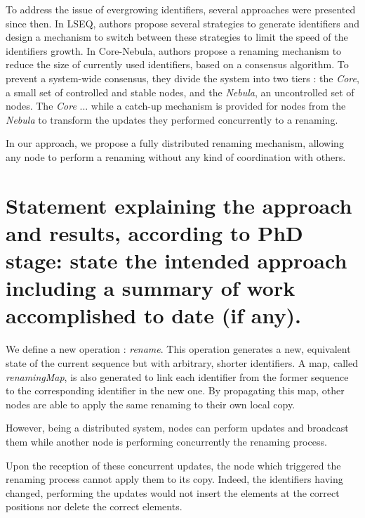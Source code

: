 \documentclass{article}
\begin{document}
To address the issue of evergrowing identifiers, several approaches were presented since then.
In LSEQ, authors propose several strategies to generate identifiers and design a mechanism to switch between these strategies to limit the speed of the identifiers growth.
In Core-Nebula, authors propose a renaming mechanism to reduce the size of currently used identifiers, based on a consensus algorithm.
To prevent a system-wide consensus, they divide the system into two tiers : the \emph{Core}, a small set of controlled and stable nodes, and the \emph{Nebula}, an uncontrolled set of nodes.
The \emph{Core} ... while a catch-up mechanism is provided for nodes from the \emph{Nebula} to transform the updates they performed concurrently to a renaming.

In our approach, we propose a fully distributed renaming mechanism, allowing any node to perform a renaming without any kind of coordination with others.

\section{Statement explaining the approach and results, according to PhD stage: state the intended approach including a summary of work accomplished to date (if any).}


We define a new operation : \emph{rename}.
This operation generates a new, equivalent state of the current sequence but with arbitrary, shorter identifiers.
A map, called \emph{renamingMap}, is also generated to link each identifier from the former sequence to the corresponding identifier in the new one.
By propagating this map, other nodes are able to apply the same renaming to their own local copy.

However, being a distributed system, nodes can perform updates and broadcast them while another node is performing concurrently the renaming process.

Upon the reception of these concurrent updates, the node which triggered the renaming process cannot apply them to its copy.
Indeed, the identifiers having changed, performing the updates would not insert the elements at the correct positions nor delete the correct elements.
\end{document}

